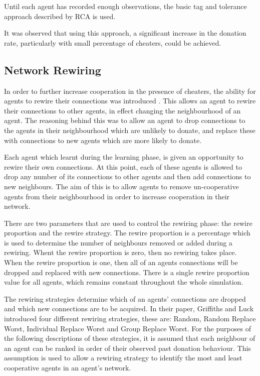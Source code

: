 Until each agent has recorded enough observations,
the basic tag and tolerance approach described by RCA is used.

It was observed that using this approach,
a significant increase in the donation rate, particularly
with small percentage of cheaters, could be achieved.

\subsection{Network Rewiring}

In order to further increase cooperation in the presence of cheaters,
the ability for agents to rewire their connections was introduced \cite{aamas2010}.
This allows an agent to rewire their connections to other agents, in effect changing the neighbourhood of an agent.
The reasoning behind this was to allow an agent to drop connections to the agents in their neighbourhood which are unlikely to donate, and replace these with connections to new agents which are more likely to donate.

Each agent which learnt during the learning phase,
is given an opportunity to rewire their own connections.
At this point, each of these agents is allowed to drop any number of its
connections to other agents and then add connections to new neighbours.
The aim of this is to allow agents to remove un-cooperative agents from
their neighbourhood in order to increase cooperation in their network.

There are two parameters that are used to control the rewiring phase:
the rewire proportion and the rewire strategy.
The rewire proportion is a percentage which is used to determine the number of
neighbours removed or added during a rewiring.
Whent the rewire proportion is zero, then no rewiring takes place.
When the rewire proportion is one, then all of an agents connections will be dropped and replaced with new connections.
There is a single rewire proportion value for all agents, which remains constant throughout the whole simulation.

The rewiring strategies determine which of an agents' connections are dropped and which new connections are to be acquired.
In their paper, Griffiths and Luck introduced four different rewiring strategies,
these are: Random, Random Replace Worst, Individual Replace Worst and Group Replace Worst.
For the purposes of the following descriptions of these strategies,
it is assumed that each neighbour of an agent can be ranked in order of their observed past donation behaviour.
This assumption is used to allow a rewiring strategy to identify the most and least cooperative agents in an agent's network.

